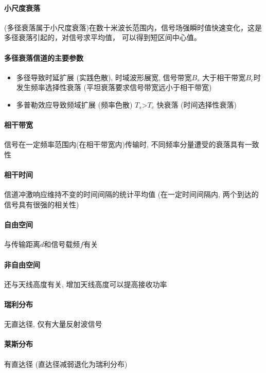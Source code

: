 \documentclass[a4paper]{report}
\begin{document}
 \paragraph{小尺度衰落}(多径衰落属于小尺度衰落)在数十米波长范围内，信号场强瞬时值快速变化，这是多径衰落引起的，对信号求平均值， 可以得到短区间中心值。

 \paragraph{多径衰落信道的主要参数}
 \begin{itemize}
	 \item 多径导致时延扩展 (实践色散), 时域波形展宽, 信号带宽$B_s$ 大于相干带宽$B_c$时发生频率选择性衰落 (平坦衰落要求信号带宽远小于相干带宽)
	 \item 多普勒效应导致频域扩展 (频率色散) $T_s$>$T_c$ 快衰落 (时间选择性衰落)
 \end{itemize}

 \paragraph{相干带宽} 信号在一定频率范围内(在相干带宽内)传输时, 不同频率分量遭受的衰落具有一致性
 \paragraph{相干时间} 信道冲激响应维持不变的时间间隔的统计平均值 (在一定时间间隔内, 两个到达的信号具有很强的相关性)

 \paragraph{自由空间} 与传输距离$d$和信号载频$f$有关
 \paragraph{非自由空间} 还与天线高度有关, 增加天线高度可以提高接收功率
 \paragraph{瑞利分布} 无直达径, 仅有大量反射波信号
 \paragraph{莱斯分布} 有直达径 (直达径减弱退化为瑞利分布)
\end{document}
